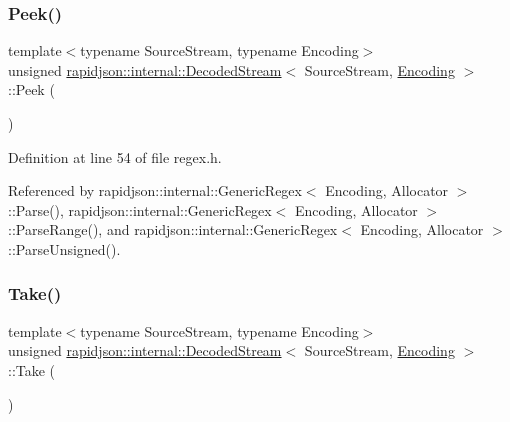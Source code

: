 \subsubsection{\texorpdfstring{Peek()}{Peek()}}
{\footnotesize\ttfamily template$<$typename Source\+Stream, typename Encoding$>$ \\
unsigned \mbox{\hyperlink{classrapidjson_1_1internal_1_1_decoded_stream}{rapidjson\+::internal\+::\+Decoded\+Stream}}$<$ Source\+Stream, \mbox{\hyperlink{classrapidjson_1_1_encoding}{Encoding}} $>$\+::Peek (\begin{DoxyParamCaption}{ }\end{DoxyParamCaption})}



Definition at line 54 of file regex.\+h.


\begin{DoxyCode}{0}

\end{DoxyCode}


Referenced by rapidjson\+::internal\+::\+Generic\+Regex$<$ Encoding, Allocator $>$\+::\+Parse(), rapidjson\+::internal\+::\+Generic\+Regex$<$ Encoding, Allocator $>$\+::\+Parse\+Range(), and rapidjson\+::internal\+::\+Generic\+Regex$<$ Encoding, Allocator $>$\+::\+Parse\+Unsigned().

\mbox{\label{classrapidjson_1_1internal_1_1_decoded_stream_a1fd014dd83e153369ecad40886093685}} 
\subsubsection{\texorpdfstring{Take()}{Take()}}
{\footnotesize\ttfamily template$<$typename Source\+Stream, typename Encoding$>$ \\
unsigned \mbox{\hyperlink{classrapidjson_1_1internal_1_1_decoded_stream}{rapidjson\+::internal\+::\+Decoded\+Stream}}$<$ Source\+Stream, \mbox{\hyperlink{classrapidjson_1_1_encoding}{Encoding}} $>$\+::Take (\begin{DoxyParamCaption}{ }\end{DoxyParamCaption})}



